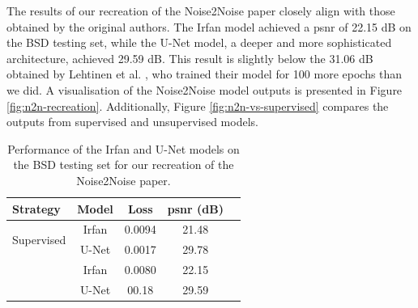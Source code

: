 The results of our recreation of the Noise2Noise paper closely align with those obtained by the original authors. The Irfan model achieved a \acrshort{psnr} of 22.15 dB on the BSD testing set, while the U-Net model, a deeper and more sophisticated architecture, achieved 29.59 dB. This result is slightly below the 31.06 dB obtained by Lehtinen et al. \cite[3]{lehtinen_noise2noise_2018}, who trained their model for 100 more epochs than we did. A visualisation of the Noise2Noise model outputs is presented in Figure \ref{fig:n2n-recreation}. Additionally, Figure \ref{fig:n2n-vs-supervised} compares the outputs from supervised and unsupervised models.

\begin{table}[htbp] 
\centering 
\caption{Performance of the Irfan and U-Net models on the BSD testing set for our recreation of the Noise2Noise paper.} 
\label{tab:n2n-imagenet-results} 
    \begin{tabular}{lcccc} 
    \toprule 
    \textbf{Strategy} & \textbf{Model} & \textbf{Loss} & \textbf{\acrshort{psnr} (dB)} \\ \midrule 
    \multirow{2}{*}{Supervised} & Irfan & 0.0094 & 21.48 \\
    & U-Net & 0.0017 & 29.78 \\
    \addlinespace
    \multirow{2}{*}{Noise2Noise} & Irfan & 0.0080 & 22.15\\
    & U-Net & 00.18 & 29.59\\ \bottomrule
    \end{tabular} 
\end{table}

